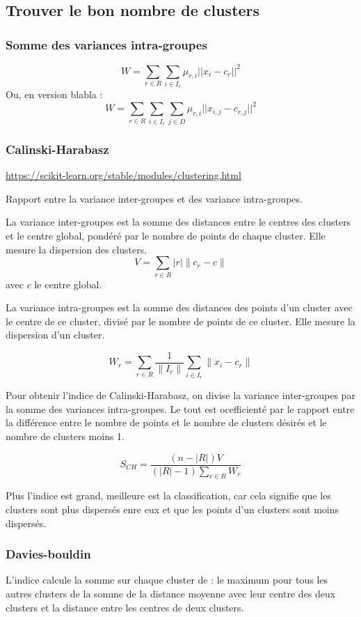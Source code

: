\subsection{Trouver le bon nombre de clusters}
\subsubsection{Somme des variances intra-groupes}
\[
W  = \sum_{r\in R}\sum_{i\in I_r}\mu_{r,i}||x_{i}-c_{r}||^2
\]
Ou, en version blabla :
\[
W  = \sum_{r\in R}\sum_{i\in I_r}\sum_{j\in D}\mu_{r,i}||x_{i,j}-c_{r,j}||^2
\]

\subsubsection{Calinski-Harabasz}
\url{https://scikit-learn.org/stable/modules/clustering.html}


Rapport entre la variance inter-groupes et des variance intra-groupes.

La variance inter-groupes est la somme des distances entre le centres des clusters et le centre global, pondéré par le nombre de points de chaque cluster. Elle mesure la dispersion des clusters.
\[
V = \sum_{r\in R}|r| \|c_{r}-c\|
\]
avec $c$ le centre global.

La variance intra-groupes est la somme des distances des points d'un cluster avec le centre de ce cluster, divisé par le nombre de points de ce cluster. Elle mesure la dispersion d'un cluster.

\[
W_r = \sum_{r\in R}\frac{1}{\|I_r\|}\sum_{i\in I_r}\|x_{i}-c_{r}\|
\]

Pour obtenir l'indice de Calinski-Harabasz, on divise la variance inter-groupes par la somme des variances intra-groupes. Le tout est ocefficienté par le rapport entre la différence entre le nombre de points et le nombre de clusters désirés et le nombre de clusters moins 1.

\[
S_{CH} = \frac{(n-|R|)V}{(|R|-1)\sum_{r\in R}W_r}
\]

Plus l'indice est grand, meilleure est la classification, car cela signifie que les clusters sont plus dispersés enre eux et que les points d'un clusters sont moins dispersés.

\subsubsection{Davies-bouldin}
L'indice calcule la somme sur chaque cluster de : le maximum pour tous les autres clusters de la somme de la distance moyenne avec leur centre des deux clusters et la distance entre les centres de deux clusters.


